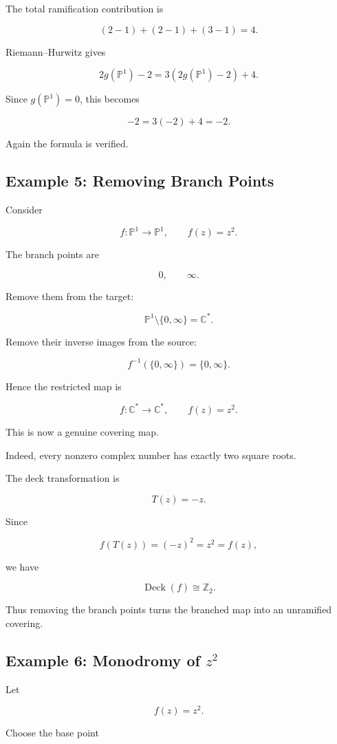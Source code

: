 \documentclass[12pt,a4paper]{article}
\theoremstyle{notespace}
\begin{document}
The total ramification contribution is

\[
(2-1)+(2-1)+(3-1)=4.
\]

Riemann--Hurwitz gives

\[
2g(\mathbb P^1)-2
=
3(2g(\mathbb P^1)-2)+4.
\]

Since \(g(\mathbb P^1)=0\), this becomes

\[
-2=3(-2)+4=-2.
\]

Again the formula is verified.

\subsection{Example 5: Removing Branch Points}

Consider

\[
f:\mathbb P^1\to\mathbb P^1,
\qquad
f(z)=z^2.
\]

The branch points are

\[
0,\qquad \infty.
\]

Remove them from the target:

\[
\mathbb P^1\setminus\{0,\infty\}
=
\mathbb C^*.
\]

Remove their inverse images from the source:

\[
f^{-1}(\{0,\infty\})
=
\{0,\infty\}.
\]

Hence the restricted map is

\[
f:\mathbb C^*\to\mathbb C^*,
\qquad
f(z)=z^2.
\]

This is now a genuine covering map.

Indeed, every nonzero complex number has exactly two square roots.

The deck transformation is

\[
T(z)=-z.
\]

Since

\[
f(T(z))=(-z)^2=z^2=f(z),
\]

we have

\[
\operatorname{Deck}(f)\cong\mathbb Z_2.
\]

Thus removing the branch points turns the branched map into an unramified covering.

\subsection{Example 6: Monodromy of \(z^2\)}

Let

\[
f(z)=z^2.
\]

Choose the base point
\end{document}
